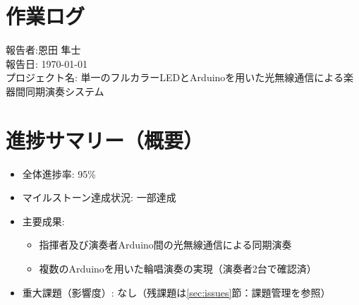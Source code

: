 \documentclass[lualatex,paper=a4paper,jafontsize=11.5pt,jafontscale=1.05]{jlreq}
\begin{document}
\section*{作業ログ}
\noindent
報告者:恩田 隼士\\
報告日: \today \\
プロジェクト名: 単一のフルカラーLEDとArduinoを用いた光無線通信による楽器間同期演奏システム \\
\hrulefill

\section{進捗サマリー（概要）}
\begin{itemize}
 \item 全体進捗率: 95\%
 \item マイルストーン達成状況: 一部達成
 \item 主要成果:
 \begin{itemize}
    \item 指揮者及び演奏者Arduino間の光無線通信による同期演奏
    \item 複数のArduinoを用いた輪唱演奏の実現（演奏者2台で確認済）
 \end{itemize}
 \item 重大課題（影響度）: なし（残課題は\ref{sec:issues}節：課題管理を参照）
\end{itemize}
\end{document}
